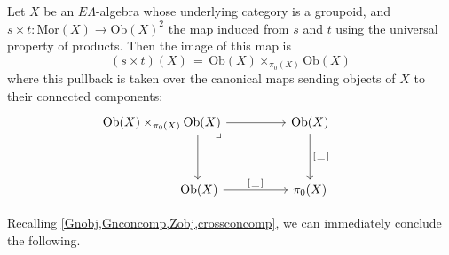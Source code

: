 \documentclass{amsbook} %
\numberwithin{section}{chapter}
\begin{document}

\begin{lem}\label{stmon} Let $X$ be an $E\Lambda$-algebra whose underlying category is a groupoid, and $s \times t: \mathrm{Mor}(X) \to \mathrm{Ob}(X)^2$ the map induced from $s$ and $t$ using the universal property of products. Then the image of this map is
\[ (s \times t)(X) \, = \, \mathrm{Ob}(X) \times_{\pi_0(X)} \mathrm{Ob}(X) \]
where this pullback is taken over the canonical maps sending objects of $X$ to their connected components:
\[ \begin{tikzcd}
\mathrm{Ob}(X) \times_{\pi_0(X)} \mathrm{Ob}(X) \ar[dd, shift left=12] \ar[rr] \ar[ddrr, phantom, "\lrcorner", near start, shift left=4] & & \mathrm{Ob}(X) \ar[dd, "\lbrack \, \_ \, \rbrack"] & \\ 
& & & \\
\quad \quad \quad \quad \quad \quad \mathrm{Ob}(X) \ar[rr, "\lbrack \, \_ \, \rbrack"] & & \pi_0(X)
\end{tikzcd} \]
\end{lem} 

Recalling \cref{Gnobj,Gnconcomp,Zobj,crossconcomp}, we can immediately conclude the following.
\end{document}
